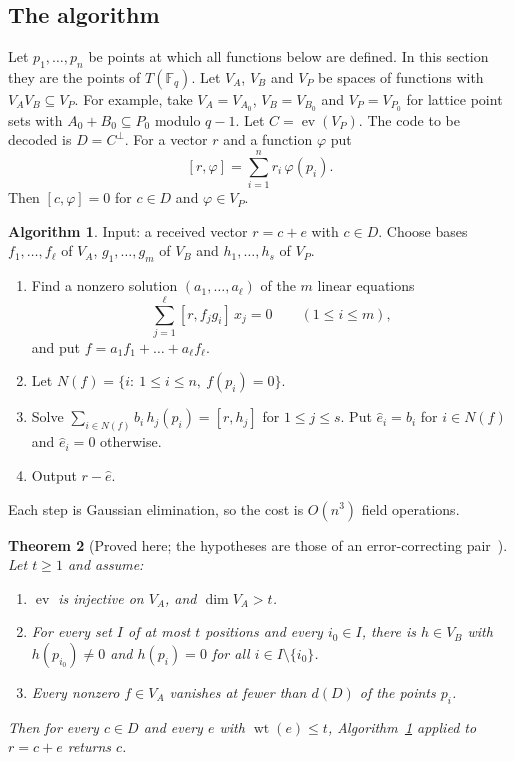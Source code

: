 \documentclass[12pt,letterpaper]{article}
\numberwithin{equation}{section}
\newtheorem{theorem}{Theorem}[section]
\theoremstyle{definition}
\newtheorem{algorithm}[theorem]{Algorithm}
\theoremstyle{remark}
\DeclareMathOperator{\wt}{wt}
\DeclareMathOperator{\ev}{ev}
\newcommand{\Fq}{\mathbb{F}_q}
\begin{document}
\subsection{The algorithm}

Let $p_1,\dots,p_n$ be points at which all functions below are defined. In
this section they are the points of $T(\Fq)$. Let $V_A$, $V_B$ and $V_P$ be
spaces of functions with $V_AV_B\subseteq V_P$. For example, take
$V_A=V_{A_0}$, $V_B=V_{B_0}$ and $V_P=V_{P_0}$ for lattice point sets with
$A_0+B_0\subseteq P_0$ modulo $q-1$. Let $C=\ev(V_P)$. The code to be decoded
is $D=C^\perp$. For a vector $r$ and a function $\varphi$ put
\[
[r,\varphi]=\sum_{i=1}^n r_i\,\varphi(p_i).
\]
Then $[c,\varphi]=0$ for $c\in D$ and $\varphi\in V_P$.

\begin{algorithm}\label{alg:decode}
Input: a received vector $r=c+e$ with $c\in D$. Choose bases $f_1,\dots,f_\ell$
of $V_A$, $g_1,\dots,g_m$ of $V_B$ and $h_1,\dots,h_s$ of $V_P$.
\begin{enumerate}[label=\arabic*.]
\item Find a nonzero solution $(a_1,\dots,a_\ell)$ of the $m$ linear
equations
\begin{equation}\label{eqn:coeffs1}
\sum_{j=1}^{\ell}[r,f_jg_i]\,x_j=0\qquad(1\le i\le m),
\end{equation}
and put $f=a_1f_1+\dots+a_\ell f_\ell$.
\item Let $N(f)=\{i:\ 1\le i\le n,\ f(p_i)=0\}$.
\item Solve $\sum_{i\in N(f)}b_i\,h_j(p_i)=[r,h_j]$ for $1\le j\le s$. Put
$\hat e_i=b_i$ for $i\in N(f)$ and $\hat e_i=0$ otherwise.
\item Output $r-\hat e$.
\end{enumerate}
Each step is Gaussian elimination, so the cost is $O(n^3)$ field operations.
\end{algorithm}

\begin{theorem}[Proved here; the hypotheses are those of an error-correcting
pair~\cite{Pe92}]\label{thm:decode}
Let $t\ge1$ and assume:
\begin{enumerate}[label=(\Alph*)]
\item $\ev$ is injective on $V_A$, and $\dim V_A>t$.
\item For every set $I$ of at most $t$ positions and every $i_0\in I$, there
is $h\in V_B$ with $h(p_{i_0})\ne0$ and $h(p_i)=0$ for all $i\in
I\setminus\{i_0\}$.
\item Every nonzero $f\in V_A$ vanishes at fewer than $d(D)$ of the points
$p_i$.
\end{enumerate}
Then for every $c\in D$ and every $e$ with $\wt(e)\le t$,
Algorithm~\ref{alg:decode} applied to $r=c+e$ returns $c$.
\end{theorem}
\end{document}

